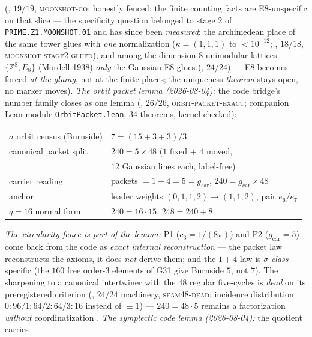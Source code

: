 \documentclass[11pt,a4paper]{article}
\newcommand{\gcar}{g_{\mathrm{car}}}
\newcommand{\cthree}{c_3}
\theoremstyle{definition}
\begin{document}
\begin{keybox}
(, $19/19$,
\textsc{moonshot-go}; honestly fenced: the finite counting facts are
E8-unspecific on that slice --- the specificity question belonged to
stage 2 of \texttt{PRIME.Z1.MOONSHOT.01} and has since been
\emph{measured}: the archimedean place of the same tower glues with
\emph{one} normalization ($\kappa=(1,1,1)$ to $<10^{-12}$;
, $18/18$,
\textsc{moonshot-stage2-glued}), and among the dimension-$8$
unimodular lattices $\{\mathbb{Z}^8,E_8\}$ (Mordell 1938) \emph{only}
the Gaussian E8 glues (,
$24/24$) --- E8 becomes forced \emph{at the gluing}, not at the
finite places; the uniqueness \emph{theorem} stays open, no marker
moves).
\emph{The orbit packet lemma (2026-08-04):} the code bridge's number
family closes as one lemma (, $26/26$,
\textsc{orbit-packet-exact}; companion Lean module
\texttt{OrbitPacket.lean}, $34$ theorems, kernel-checked):
\begin{center}
\begin{tabular}{ll}
$\sigma$ orbit census (Burnside) & $7=(15+3+3)/3$ \\
canonical packet split & $240=5\times48$ ($1$ fixed $+$ $4$ moved, \\
 & \quad $12$ Gaussian lines each, label-free) \\
carrier reading & packets $=1+4=5=\gcar$, $240=\gcar\times48$ \\
anchor & leader weights $(0,1,1,2)\to(1,1,2)$, pair $e_6/e_7$ \\
$q=16$ normal form & $240=16\cdot15$, \quad $248=240+8$ \\
\end{tabular}
\end{center}
\emph{The circularity fence is part of the lemma:} P1
($\cthree=1/(8\pi)$) and P2 ($\gcar=5$) come back from the code as
\emph{exact internal reconstruction} --- the packet law reconstructs
the axioms, it does \emph{not} derive them; and the $1+4$ law is
$\sigma$-\emph{class}-specific (the $160$ free order-$3$ elements of
G31 give Burnside $5$, not $7$).  The sharpening to a canonical
intertwiner with the $48$ regular five-cycles is \emph{dead} on its
preregistered criterion (,
$24/24$ machinery, \textsc{seam48-dead}: incidence distribution
$0{:}96/1{:}64/2{:}64/3{:}16$ instead of $\equiv1$) --- $240=48\cdot5$
remains a factorization \emph{without} coordinatization \mE.
\emph{The symplectic code lemma (2026-08-04):} the quotient carries

\end{keybox}
\end{document}
